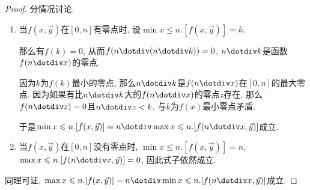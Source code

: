\begin{proof}
    分情况讨论.
    \begin{enumerate}
        \item 当$f(x,\vec{y})$在$[0,n]$有零点时, 设$\min x\leqslant n. [f(x,\vec{y})]=k$.

        那么有$f(k)=0$, 从而$f(n\dotdiv(n\dotdiv k))=0$, $n\dotdiv k$是函数$f(n\dotdiv x)$的零点.
    
        因为$k$为$f(k)$最小的零点, 那么$n\dotdiv k$是$f(n\dotdiv x)$在$[0,n]$的最大零点. 因为如果有比$n\dotdiv k$大的$f(n\dotdiv x)$的零点$z$存在, 那么$f(n\dotdiv z)=0$且$n\dotdiv z<k$, 与$k$为$f(x)$最小零点矛盾.
    
        于是$\min x\leqslant n. [f(x,\vec{y})]=n\dotdiv\max x\leqslant n. [f(n\dotdiv x,\vec{y})]$成立.

        \item 当$f(x,\vec{y})$在$[0,n]$没有零点时, $\min x\leqslant n. [f(x,\vec{y})]=n$, $\max x\leqslant n. [f(n\dotdiv x,\vec{y})] = 0$, 因此式子依然成立.
    \end{enumerate}
	
    同理可证, $\max x\leqslant n. [f(x,\vec{y})]=n\dotdiv\min x\leqslant n. [f(n\dotdiv x,\vec{y})]$成立.
\end{proof}